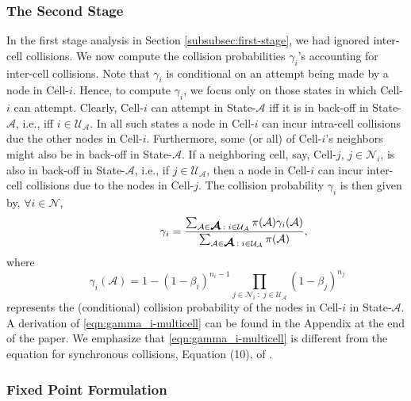 \documentclass[10pt,a4paper,journal]{IEEEtran}
\theoremstyle{definition}
\theoremstyle{remark}
\theoremstyle{plain}
\newcommand{\bmath}[1]{\mbox{\boldmath$#1$}}
\begin{document}
\subsubsection{The Second Stage}
\label{subsubsec:second-stage}

In the first stage analysis in Section \ref{subsubsec:first-stage}, we had ignored inter-cell collisions. We now compute the collision probabilities $\gamma_i$'s accounting for inter-cell collisions.  Note that $\gamma_i$ is conditional on an attempt being made by a node in Cell-$i$. Hence, to compute $\gamma_i$, we focus only on those states in which Cell-$i$ can attempt. Clearly, Cell-$i$ can attempt in State-$\mathcal{A}$ iff it is in back-off in State-$\mathcal{A}$, i.e., iff $i \in \mathcal{U}_{\mathcal{A}}$. In all such states a node in Cell-$i$ can incur intra-cell collisions due the other nodes in Cell-$i$. Furthermore, some (or all) of Cell-$i$'s neighbors might also be in back-off in State-$\mathcal{A}$.  If a neighboring cell, say, Cell-$j$, $j \in \mathcal{N}_i$, is also in back-off in State-$\mathcal{A}$, i.e., if $j \in \mathcal{U}_{\mathcal{A}}$, then a node in Cell-$i$ can incur inter-cell collisions due to the nodes in Cell-$j$.  The collision probability $\gamma_i$ is then given by, $\forall i \in \mathcal{N}$, 
\begin{equation}
\label{eqn:gamma_i-multicell}
\quad \quad \quad \quad \quad \gamma_i = \frac{ \sum_{\mathcal{A} \in \bmath{\mathcal{A}} \; : \; i
    \in \mathcal{U}_{\mathcal{A}}} \pi(\mathcal{A})
  \gamma_i(\mathcal{A})}{ \sum_{\mathcal{A} \in \bmath{\mathcal{A}} \;
    : \; i \in \mathcal{U}_{\mathcal{A}}} \pi(\mathcal{A})},
\end{equation} 
where 
\[\quad \quad \gamma_i(\mathcal{A}) = 1 - (1-\beta_i)^{n_i-1} \prod_{j \in \mathcal{N}_i \; : \; j \in \mathcal{U}_{\mathcal{A}}} (1-\beta_j)^{n_j}\] 
represents the (conditional) collision probability of the nodes in Cell-$i$ in State-$\mathcal{A}$. A derivation of \eqref{eqn:gamma_i-multicell} can be found in the Appendix at the end of the paper. We emphasize that \eqref{eqn:gamma_i-multicell} is different from the equation for synchronous collisions, Equation (10), of \cite{wanet.garetto_etal08starvation}. 








\subsubsection{Fixed Point Formulation}
\label{subsubsec:fixed-point-formulation}
\end{document}
